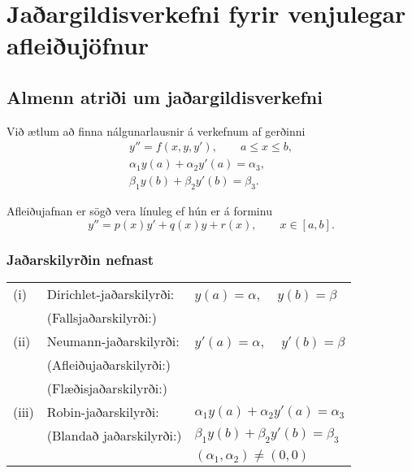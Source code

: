 \documentclass[icelandic,a4paper,12pt]{article}
\begin{document}
\section{Jaðargildisverkefni fyrir 
  venjulegar afleiðujöfnur}



\subsection{Almenn atriði um jaðargildisverkefni}
Við ætlum að finna nálgunarlausnir á verkefnum af gerðinni
  \begin{gather*}
    y''=f(x,y,y'), \qquad a\leq x\leq b,\\
\alpha_1y(a)+\alpha_2 y'(a)=\alpha_3,\\
\beta_1 y(b)+\beta_2y'(b)=\beta_3.  
  \end{gather*}

\pause
Afleiðujafnan er sögð vera línuleg ef hún er á forminu
$$
y''=p(x)y'+q(x)y+r(x), \qquad x\in [a,b].
$$


\subsubsection{Jaðarskilyrðin nefnast}
\begin{tabular}{lll}
(i)  &Dirichlet-jaðarskilyrði: &  $y(a)=\alpha$, \ \  $y(b)=\beta$\\
&(Fallsjaðarskilyrði:) \\ \pause
(ii)&Neumann-jaðarskilyrði: 
& $y'(a)=\alpha$, \ \  $y'(b)=\beta$\\
&(Afleiðujaðarskilyrði:)\\
&(Flæðisjaðarskilyrði:)\\\pause
(iii)&Robin-jaðarskilyrði: 
&$\alpha_1y(a)+\alpha_2 y'(a)=\alpha_3$ \\ 
&(Blandað jaðarskilyrði:)&$\beta_1 y(b)+\beta_2y'(b)=\beta_3$\\
&&$(\alpha_1,\alpha_2)\neq (0,0)$
\end{tabular}
\pause
\end{document}
